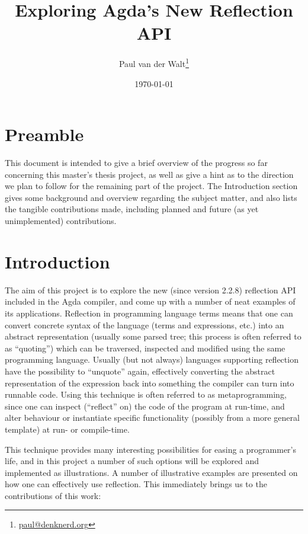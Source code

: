 \documentclass[a4paper]{article}
\author{Paul van der Walt\footnote{\url{paul@denknerd.org}}}
\date{\today}
\title{Exploring Agda's New Reflection API}
\begin{document}
\maketitle


\section{Preamble}

This document is intended to give a brief overview of the progress so far concerning
this master's thesis project, as well as give a hint as to the direction we plan to follow
for the remaining part of the project. The Introduction section gives some background and
overview regarding the subject matter, and also lists
the tangible contributions made, including planned and future (as yet unimplemented) contributions.


\section{Introduction}

The aim of this project is to explore the new (since version 2.2.8) reflection API included in the Agda
compiler, and come up with a number of neat examples of its applications. Reflection in programming language
terms means that one can convert concrete syntax of the language (terms and expressions, etc.) into an abstract
representation (usually some parsed tree; this process is often referred to as ``quoting'')
which can be traversed, inspected and modified using the same programming
language. Usually (but not always) languages supporting reflection have the possibility to
``unquote'' again, effectively
converting the abstract representation of the expression back into something the compiler
can turn into runnable code. Using this technique is often referred to as metaprogramming,
since one can inspect (``reflect'' on) the code of the program at run-time, and alter behaviour
or instantiate specific functionality (possibly from a more general template) at run- or compile-time.

This technique provides many interesting possibilities for easing a programmer's life, and in
this project a number of such options will be explored and implemented as illustrations. A number of illustrative
examples are presented on how one can effectively use reflection. 
This immediately brings us to the contributions of this work:
\end{document}
